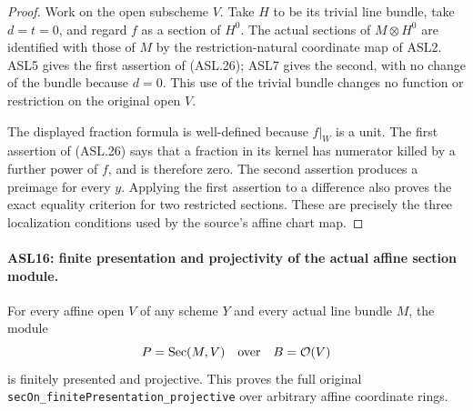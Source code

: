 \documentclass[11pt,a4paper]{article}
\numberwithin{equation}{section}
\theoremstyle{remark}\newtheorem{remark}[theorem]{Remark}
\begin{document}
\begin{proof}
Work on the open subscheme $V$.  Take $H$ to be its trivial
line bundle, take $d=t=0$, and regard $f$ as a section of
$H^0$.  The actual sections of $M\otimes H^0$ are identified
with those of $M$ by the restriction-natural coordinate map
of ASL2.  ASL5 gives the first assertion of (ASL.26); ASL7
gives the second, with no change of the bundle because $d=0$.
This use of the trivial bundle changes no function or restriction
on the original open $V$.

The displayed fraction formula is well-defined because $f|_W$
is a unit.  The first assertion of (ASL.26) says that a fraction
in its kernel has numerator killed by a further power of $f$,
and is therefore zero.  The second assertion produces a
preimage for every $y$.  Applying the first assertion to a
difference also proves the exact equality criterion for two
restricted sections.  These are precisely the three localization
conditions used by the source's affine chart map.
\end{proof}

\paragraph{ASL16: finite presentation and projectivity of the actual affine section module.}
\label{claim:ASL16}
For every affine open $V$ of any scheme $Y$ and every actual
line bundle $M$, the module
\[
                    P=\operatorname{Sec}(M,V)
              \quad\hbox{over}\quad B=\mathcal O(V)
\]
is finitely presented and projective.  This proves the full
original \texttt{sec\allowbreak{}On\_\allowbreak{}finite\allowbreak{}Presentation\_\allowbreak{}projective} over
arbitrary affine coordinate rings.
\end{document}
